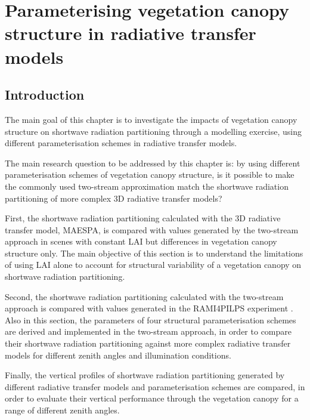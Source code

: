 \documentclass[a4paper,11pt]{report}
\title{}
\author{Renato Kerches Braghiere \\ This document was written in \LaTeX \\ Number of words: 12213}
\date{\today}
\begin{document}
\maketitle
\setcounter{chapter}{3} %

\chapter{Parameterising vegetation canopy structure in radiative transfer models}

\section{Introduction}\label{introduction}
The main goal of this chapter is to investigate the impacts of vegetation canopy structure on shortwave radiation partitioning through a modelling exercise, using different parameterisation schemes in radiative transfer models.

The main research question to be addressed by this chapter is: by using different parameterisation schemes of vegetation canopy structure, is it possible to make the commonly used two-stream approximation \citep{Sellers1985} match the shortwave radiation partitioning of more complex 3D radiative transfer models?

First, the shortwave radiation partitioning calculated with the 3D radiative transfer model, MAESPA, is compared with values generated by the two-stream approach in scenes with constant LAI but differences in vegetation canopy structure only. The main objective of this section is to understand the limitations of using LAI alone to account for structural variability of a vegetation canopy on shortwave radiation partitioning.

Second, the shortwave radiation partitioning calculated with the two-stream approach is compared with values generated in the RAMI4PILPS experiment \citep{Widlowski2011}. Also in this section, the parameters of four structural parameterisation schemes \citep{Nilson1971,Kucharik1999,pinty2006,Ni-Meister2010} are derived and implemented in the two-stream approach, in order to compare their shortwave radiation partitioning against more complex radiative transfer models for different zenith angles and illumination conditions.

Finally, the vertical profiles of shortwave radiation partitioning generated by different radiative transfer models and parameterisation schemes are compared, in order to evaluate their vertical performance through the vegetation canopy for a range of different zenith angles.
\end{document}
